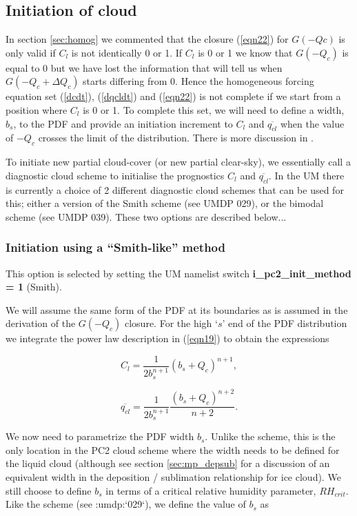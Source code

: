 \documentclass{UMDP_article}
\newcommand{\citeumdp}[1]{:umdp:`#1`}
\begin{document}
\subsection{Initiation of cloud}
\label{sec:init}
In section \ref{sec:homog} we commented that the closure (\ref{eqn22}) for $G(-Qc)$
is only valid if $C_l$ is not identically 0 or 1. If $C_l$
is 0 or 1 we know that $G(-Q_c)$ is equal to 0 but we have lost the
information that will tell us when $G(-Q_c + \Delta Q_c)$ starts
differing from 0. Hence the homogeneous forcing equation set
(\ref{dcdt}), (\ref{dqcldt}) and (\ref{eqn22}) is not complete if
we start from a position where $C_l$ is 0 or 1. To complete this set,
we will need to define a width, $b_s$, to the PDF and provide an initiation
increment to $C_l$ and $\overline{q_{cl}}$ when the value of $-Q_c$ crosses
the limit of the distribution. There is more discussion in
\cite{wg03}.

To initiate new partial cloud-cover (or new partial clear-sky), we essentially
call a diagnostic cloud scheme to initialise the prognostics
$C_l$ and $\overline{q_{cl}}$.
In the UM there is currently a choice of 2 different diagnostic cloud
schemes that can be used for this; either a version of the Smith scheme
(see UMDP 029), or the bimodal scheme (see UMDP 039).
These two options are described below...

\subsubsection{Initiation using a ``Smith-like'' method}

This option is selected by setting the UM namelist switch
{\bf i\_pc2\_init\_method = 1} (Smith).

We will assume the same form of the PDF at its boundaries as is
assumed in the derivation of the $G(-Q_c)$ closure. For the high `$s$' end
of the PDF distribution we integrate the power law description in
(\ref{eqn19}) to obtain the expressions

\begin{equation}
C_l = \frac{1}{2 b_s^{n+1}} (b_s + Q_c)^{n+1} ,
\label{eq:initc}
\end{equation}

\begin{equation}
\overline{q_{cl}} = \frac{1}{2 b_s^{n+1}} \frac{(b_s + Q_c)^{n+2}}{n+2} .
\label{eq:initqcl}
\end{equation}

We now need to parametrize the PDF width $b_s$. Unlike the \cite{smith90} 
scheme, this is the only
location in the PC2 cloud scheme where the width needs to be defined
for the liquid cloud (although see section \ref{sec:mp_depsub} for
a discussion of an equivalent width in the deposition / sublimation
relationship for ice cloud). We still choose to define $b_s$ in
terms of a critical relative humidity parameter, $RH_{crit}$. Like
the \cite{smith90} scheme (see \citeumdp{029}),
we define the value of $b_s$ as
\end{document}
